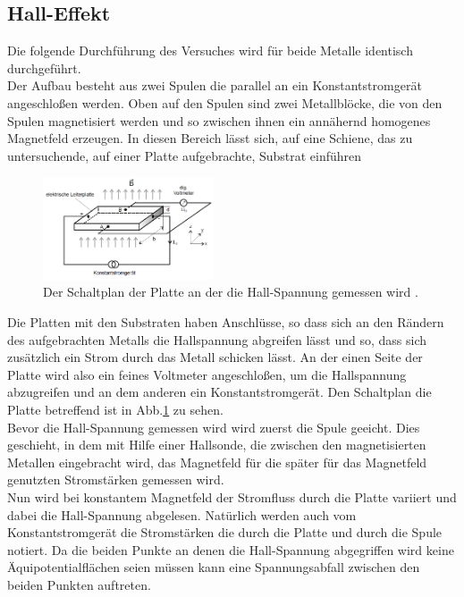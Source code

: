 \subsection{Hall-Effekt}
Die folgende Durchführung des Versuches wird für beide Metalle identisch durchgeführt.\\
Der Aufbau besteht aus zwei Spulen die parallel an ein Konstantstromgerät angeschloßen werden. 
Oben auf den Spulen sind zwei Metallblöcke, die von den Spulen magnetisiert werden und so zwischen ihnen ein annähernd homogenes Magnetfeld erzeugen.
In diesen Bereich lässt sich, auf eine Schiene, das zu untersuchende, auf einer Platte aufgebrachte, Substrat einführen\\
\begin{figure}[H]
    \centering
    \includegraphics[width=0.45\textwidth]{images/hall.PNG}
    \caption{Der Schaltplan der Platte an der die Hall-Spannung gemessen wird \protect \cite{V311}.}
    \label{img:hall2}
  \end{figure}
\noindent
Die Platten mit den Substraten haben Anschlüsse, so dass sich an den Rändern des aufgebrachten Metalls die Hallspannung abgreifen lässt und so, 
dass sich zusätzlich ein Strom durch das Metall schicken lässt.
An der einen Seite der Platte wird also ein feines Voltmeter angeschloßen, um die Hallspannung abzugreifen und an dem anderen ein Konstantstromgerät.
Den Schaltplan die Platte betreffend ist in Abb.\ref{img:hall2} zu sehen.\\
Bevor die Hall-Spannung gemessen wird wird zuerst die Spule geeicht. Dies geschieht, in dem mit Hilfe einer Hallsonde, die zwischen den magnetisierten Metallen eingebracht wird,
das Magnetfeld für die später für das Magnetfeld genutzten Stromstärken gemessen wird.\\
Nun wird bei konstantem Magnetfeld der Stromfluss durch die Platte variiert und dabei die Hall-Spannung abgelesen.
Natürlich werden auch vom Konstantstromgerät die Stromstärken die durch die Platte und durch die Spule notiert.
Da die beiden Punkte an denen die Hall-Spannung abgegriffen wird keine Äquipotentialflächen seien müssen kann eine Spannungsabfall zwischen den beiden Punkten auftreten.
